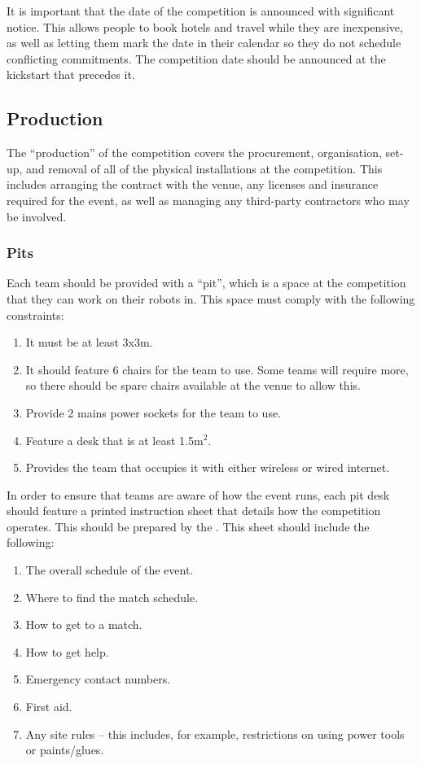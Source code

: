 It is important that the date of the competition is announced with significant notice.  This allows people to book hotels and travel while they are inexpensive, as well as letting them mark the date in their calendar so they do not schedule conflicting commitments.  The competition date should be announced at the kickstart that precedes it.

\subsection{Production}

The ``production'' of the competition covers the procurement, organisation, set-up, and removal of all of the physical installations at the competition.  This includes arranging the contract with the venue, any licenses and insurance required for the event, as well as managing any third-party contractors who may be involved.

\subsubsection{Pits}

Each team should be provided with a ``pit'', which is a space at the competition that they can work on their robots in.  This space must comply with the following constraints:
\begin{enumerate}
\item It must be at least 3x3m.
\item It should feature 6 chairs for the team to use.  Some teams will require more, so there should be spare chairs available at the venue to allow this.
\item Provide 2 mains power sockets for the team to use.
\item Feature a desk that is at least 1.5m$^2$.
\item Provides the team that occupies it with either wireless or wired internet.
\end{enumerate}

In order to ensure that teams are aware of how the event runs, each pit desk should feature a printed instruction sheet that details how the competition operates.  This should be prepared by the .  This sheet should include the following:
\begin{enumerate}
\item The overall schedule of the event.
\item Where to find the match schedule.
\item How to get to a match.
\item How to get help.
\item Emergency contact numbers.
\item First aid.
\item Any site rules -- this includes, for example, restrictions on using power tools or paints/glues.
\end{enumerate}

